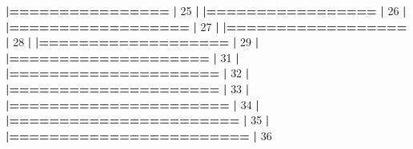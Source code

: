 \documentclass[]{book}
\newenvironment{Shaded}{\begin{snugshade}}{\end{snugshade}}
\newcommand{\DecValTok}[1]{\textcolor[rgb]{0.00,0.00,0.81}{#1}}
\newcommand{\ErrorTok}[1]{\textcolor[rgb]{0.64,0.00,0.00}{\textbf{#1}}}
\newcommand{\NormalTok}[1]{#1}
\newcommand{\OperatorTok}[1]{\textcolor[rgb]{0.81,0.36,0.00}{\textbf{#1}}}
\newcommand{\StringTok}[1]{\textcolor[rgb]{0.31,0.60,0.02}{#1}}
\begin{document}
\begin{Shaded}
\begin{Highlighting}[]
{{{{{{{{{{{{{{{{{{\StringTok{  }\ErrorTok{|================}\StringTok{                                                 }\ErrorTok{|}\StringTok{  }\DecValTok{25}\NormalTok{%}
  \OperatorTok{|}\StringTok{                                                                       }
\StringTok{  }\ErrorTok{|=================}\StringTok{                                                }\ErrorTok{|}\StringTok{  }\DecValTok{26}\NormalTok{%}
  \OperatorTok{|}\StringTok{                                                                       }
\StringTok{  }\ErrorTok{|==================}\StringTok{                                               }\ErrorTok{|}\StringTok{  }\DecValTok{27}\NormalTok{%}
  \OperatorTok{|}\StringTok{                                                                       }
\StringTok{  }\ErrorTok{|==================}\StringTok{                                               }\ErrorTok{|}\StringTok{  }\DecValTok{28}\NormalTok{%}
  \OperatorTok{|}\StringTok{                                                                       }
\StringTok{  }\ErrorTok{|===================}\StringTok{                                              }\ErrorTok{|}\StringTok{  }\DecValTok{29}\NormalTok{%}
  \OperatorTok{|}\StringTok{                                                                       }
\StringTok{  }\ErrorTok{|====================}\StringTok{                                             }\ErrorTok{|}\StringTok{  }\DecValTok{31}\NormalTok{%}
  \OperatorTok{|}\StringTok{                                                                       }
\StringTok{  }\ErrorTok{|=====================}\StringTok{                                            }\ErrorTok{|}\StringTok{  }\DecValTok{32}\NormalTok{%}
  \OperatorTok{|}\StringTok{                                                                       }
\StringTok{  }\ErrorTok{|=====================}\StringTok{                                            }\ErrorTok{|}\StringTok{  }\DecValTok{33}\NormalTok{%}
  \OperatorTok{|}\StringTok{                                                                       }
\StringTok{  }\ErrorTok{|======================}\StringTok{                                           }\ErrorTok{|}\StringTok{  }\DecValTok{34}\NormalTok{%}
  \OperatorTok{|}\StringTok{                                                                       }
\StringTok{  }\ErrorTok{|=======================}\StringTok{                                          }\ErrorTok{|}\StringTok{  }\DecValTok{35}\NormalTok{%}
  \OperatorTok{|}\StringTok{                                                                       }
\StringTok{  }\ErrorTok{|========================}\StringTok{                                         }\ErrorTok{|}\StringTok{  }\DecValTok{36}\NormalTok{%}
}}}}}}}}}}}}}}}}}}}}}}}}}}}}}
\end{Highlighting}
\end{Shaded}
\end{document}
